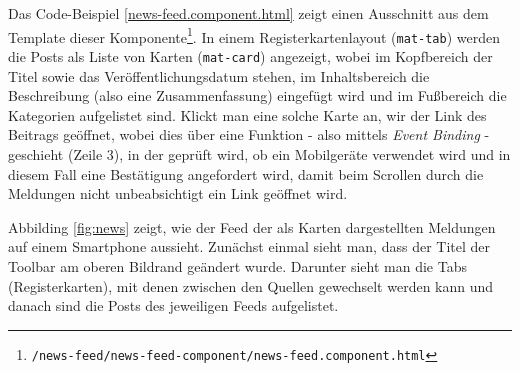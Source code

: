 Das Code-Beispiel \ref{news-feed.component.html} zeigt einen Ausschnitt aus dem Template dieser Komponente\footnote{\texttt{/news-feed/news-feed-component/news-feed.component.html}}. In einem Registerkartenlayout (\texttt{mat-tab}) werden die Posts als Liste von Karten (\texttt{mat-card}) angezeigt, wobei im Kopfbereich der Titel sowie das Veröffentlichungsdatum stehen, im Inhaltsbereich die Beschreibung (also eine Zusammenfassung) eingefügt wird und im Fußbereich die Kategorien aufgelistet sind. Klickt man eine solche Karte an, wir der Link des Beitrags geöffnet, wobei dies über eine Funktion - also mittels \textit{Event Binding} - geschieht (Zeile 3), in der geprüft wird, ob ein Mobilgeräte verwendet wird und in diesem Fall eine Bestätigung angefordert wird, damit beim Scrollen durch die Meldungen nicht unbeabsichtigt ein Link geöffnet wird.

Abbilding \ref{fig:news} zeigt, wie der Feed der als Karten dargestellten Meldungen auf einem Smartphone aussieht. Zunächst einmal sieht man, dass der Titel der Toolbar am oberen Bildrand geändert wurde. Darunter sieht man die Tabs (Registerkarten), mit denen zwischen den Quellen gewechselt werden kann und danach sind die Posts des jeweiligen Feeds aufgelistet.

